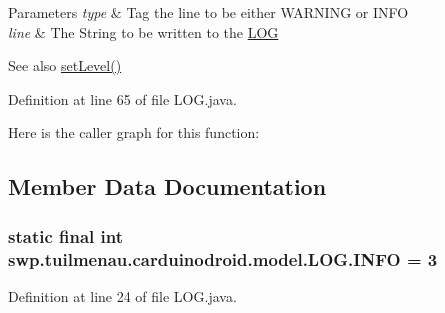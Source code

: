 \begin{DoxyParams}{Parameters}
{\em type} & Tag the line to be either W\+A\+R\+N\+I\+N\+G or I\+N\+F\+O \\
\hline
{\em line} & The String to be written to the \hyperlink{classswp_1_1tuilmenau_1_1carduinodroid_1_1model_1_1_l_o_g}{L\+O\+G} \\
\hline
\end{DoxyParams}
\begin{DoxySeeAlso}{See also}
\hyperlink{classswp_1_1tuilmenau_1_1carduinodroid_1_1model_1_1_l_o_g_af5353ab3a1312b1078ca115fa6e96fcf}{set\+Level()} 
\end{DoxySeeAlso}


Definition at line 65 of file L\+O\+G.\+java.



Here is the caller graph for this function\+:




\subsection{Member Data Documentation}
\hypertarget{classswp_1_1tuilmenau_1_1carduinodroid_1_1model_1_1_l_o_g_a5a782d2e690478a0f5b8991711ff50be}{}
\subsubsection[{I\+N\+F\+O}]{\setlength{\rightskip}{0pt plus 5cm}static final int swp.\+tuilmenau.\+carduinodroid.\+model.\+L\+O\+G.\+I\+N\+F\+O = 3\hspace{0.3cm}{\ttfamily [static]}}\label{classswp_1_1tuilmenau_1_1carduinodroid_1_1model_1_1_l_o_g_a5a782d2e690478a0f5b8991711ff50be}


Definition at line 24 of file L\+O\+G.\+java.

\hypertarget{classswp_1_1tuilmenau_1_1carduinodroid_1_1model_1_1_l_o_g_afff29e0c91f6559acbe2e9a26b523260}{}
